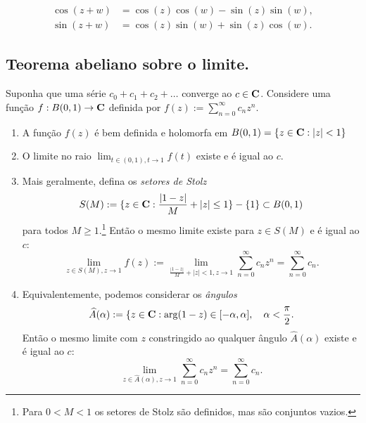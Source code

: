 \begin{cor}
\begin{align*}
\cos(z+w) &= \cos(z)\cos(w) - \sin(z)\sin(w), \\
\sin(z+w) &= \cos(z)\sin(w) + \sin(z)\cos(w). 
\end{align*}
\end{cor}


\subsection{Teorema abeliano sobre o limite.}

\begin{teorema}
\label{t:abel-limite}
Suponha que uma série $c_0 + c_1 + c_2 + \dots$ converge ao $c\in\mathbf{C}$.
Considere uma função $f: B(0,1) \to \mathbf{C}$ definida
por $f(z) := \sum_{n=0}^\infty c_n z^n$.
\begin{enumerate}
\item A função $f(z)$ é bem definida e holomorfa em $B(0,1) = \{z\in\mathbf{C}: |z|<1\}$
\item O limite no raio $\lim_{t\in(0,1),t\to 1} f(t)$ existe e é igual ao $c$.
\item Mais geralmente, defina os \emph{setores de Stolz}
\[ S(M) := \{z\in \mathbf{C}: \frac{|1-z|}M + |z| \leq 1 \}-\{1\} \subset B(0,1) \]
para todos $M\geq1$.\footnote{Para $0<M<1$ os setores de Stolz são definidos, mas são conjuntos vazios.}
Então o mesmo limite existe para $z\in S(M)$ e é igual ao $c$:
\[ \lim_{z\in S(M),z\to 1} f(z) 
:= \lim_{\frac{|1-z|}M + |z|<1,z\to 1} \sum_{n=0}^\infty c_n z^n = \sum_{n=0}^\infty c_n. \]
\item Equivalentemente, podemos considerar os \emph{ângulos}
\[ \widehat{A}(\alpha) := \{z\in \mathbf{C}: \arg(1-z) \in [-\alpha,\alpha], \quad \alpha < \frac{\pi}2. \]
Então o mesmo limite com $z$ constringido ao qualquer ângulo $\widehat{A}(\alpha)$ existe e é igual ao $c$:
\[ \lim_{z\in \widehat{A}(\alpha),z\to 1} \sum_{n=0}^\infty c_n z^n = \sum_{n=0}^\infty c_n. \]
\end{enumerate}
\end{teorema}
